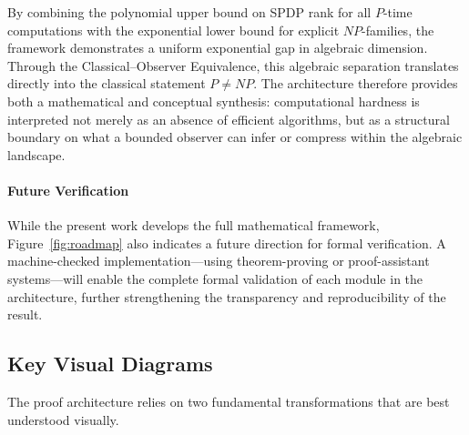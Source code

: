 \documentclass[12pt]{article}
\theoremstyle{definition}
\theoremstyle{definition}
\theoremstyle{remark}
\theoremstyle{remark}
\begin{document}
By combining the polynomial upper bound on SPDP rank for all $P$-time computations with the exponential lower bound for explicit $NP$-families, the framework demonstrates a uniform exponential gap in algebraic dimension. Through the Classical--Observer Equivalence, this algebraic separation translates directly into the classical statement $P \neq NP$. The architecture therefore provides both a mathematical and conceptual synthesis: computational hardness is interpreted not merely as an absence of efficient algorithms, but as a structural boundary on what a bounded observer can infer or compress within the algebraic landscape.

\paragraph{Future Verification}

While the present work develops the full mathematical framework, Figure~\ref{fig:roadmap} also indicates a future direction for formal verification. A machine-checked implementation---using theorem-proving or proof-assistant systems---will enable the complete formal validation of each module in the architecture, further strengthening the transparency and reproducibility of the result.

\subsection{Key Visual Diagrams}

The proof architecture relies on two fundamental transformations that are best understood visually.
\end{document}
